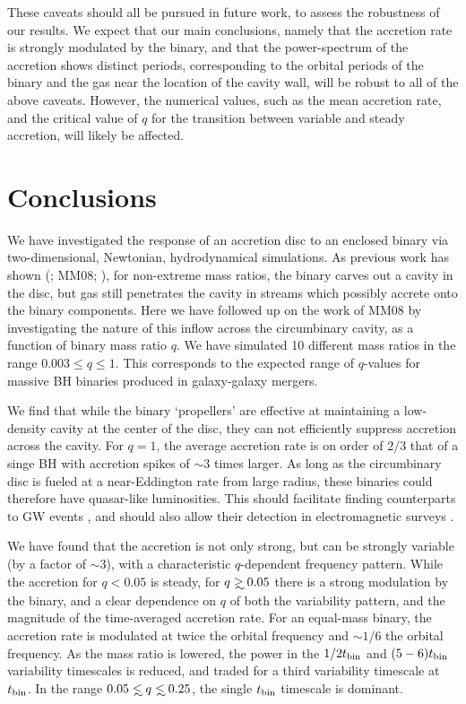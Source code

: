These caveats should all be pursued in future work, to assess the
robustness of our results.  We expect that our main conclusions,
namely that the accretion rate is strongly modulated by the binary,
and that the power-spectrum of the accretion shows distinct periods,
corresponding to the orbital periods of the binary and the gas near
the location of the cavity wall, will be robust to all of the above
caveats.  However, the numerical values, such as the mean accretion
rate, and the critical value of $q$ for the transition between
variable and steady accretion, will likely be affected.



\section{Conclusions}
\label{Conclusions}

We have investigated the response of an accretion disc to an enclosed
binary via two-dimensional, Newtonian, hydrodynamical simulations. As
previous work has shown (\citealt{Artymowicz:1994, Hayasaki:2007};
MM08; \citealt{Cuadra:2009, ShiKrolik:2012, Roedig:2012}), for
non-extreme mass ratios, the binary carves out a cavity in the disc,
but gas still penetrates the cavity in streams which possibly accrete
onto the binary components. Here we have followed up on the work of
MM08 by investigating the nature of this inflow across the
circumbinary cavity, as a function of binary mass ratio $q$.  We have
simulated 10 different mass ratios in the range $0.003 \leq q \leq
1$. This corresponds to the expected range of $q$-values for massive
BH binaries produced in galaxy-galaxy mergers.

We find that while the binary `propellers' are effective at
maintaining a low-density cavity at the center of the disc, they can
not efficiently suppress accretion across the cavity.  
For $q=1$, the average accretion rate is on order of $2/3$ that of a singe BH 
with accretion spikes of $\sim3$ times larger.  As long
as the circumbinary disc is fueled at a near-Eddington rate from large
radius, these binaries could therefore have quasar-like luminosities.
This should facilitate finding counterparts to GW events
\citep{Kocsis+2006}, and should also allow their detection in
electromagnetic surveys \citep{HKM09}. 


We have found that the accretion is not only strong, but can be
strongly variable (by a factor of $\sim3$), with a characteristic $q$-dependent frequency
pattern.  While the accretion for $q<0.05$ is steady, for $q\gsim
0.05$ there is a strong modulation by the binary, and a clear
dependence on $q$ of both the variability pattern, and the magnitude
of the time-averaged accretion rate.  For an equal-mass binary, the
accretion rate is modulated at twice the orbital frequency and $\sim
1/6$ the orbital frequency.  As the mass ratio is lowered, the power
in the $1/2 t_{\rm bin}$ and $(5-6)t_{\rm bin}$ variability timescales is
reduced, and traded for a third variability timescale at $t_{\rm
  bin}$.  In the range $0.05 \lsim q \lsim 0.25$, the single
$t_{\rm bin}$ timescale is dominant.   


